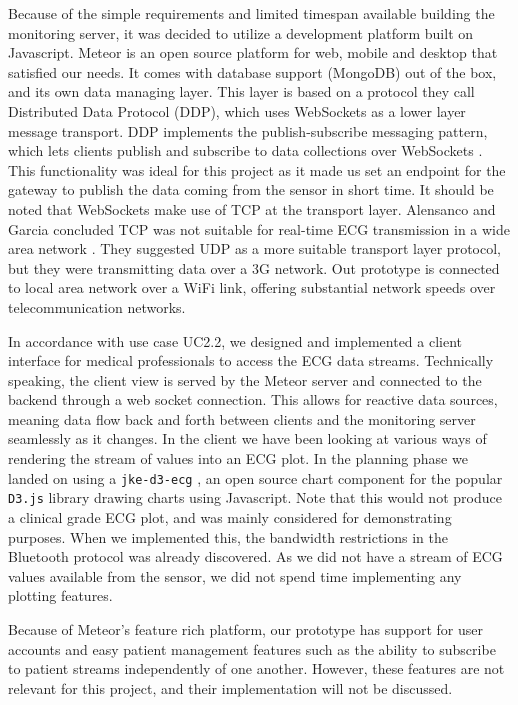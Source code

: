 Because of the simple requirements and limited timespan available building the monitoring server, it was decided to utilize a development platform built on Javascript. Meteor \cite{meteor} is an open source platform for web, mobile and desktop that satisfied our needs. It comes with database support (MongoDB) out of the box, and its own data managing layer. This layer is based on a protocol they call Distributed Data Protocol (DDP), which uses WebSockets as a lower layer message transport. DDP implements the publish-subscribe messaging pattern, which lets clients publish and subscribe to data collections over WebSockets \cite{ddp:github}. This functionality was ideal for this project as it made us set an endpoint for the gateway to publish the data coming from the sensor in short time. It should be noted that WebSockets make use of TCP at the transport layer. Alensanco and Garcia concluded TCP was not suitable for real-time ECG transmission in a wide area network \cite{Alesanco:2010kc}. They suggested UDP as a more suitable transport layer protocol, but they were transmitting data over a 3G network. Out prototype is connected to local area network over a WiFi link, offering substantial network speeds over telecommunication networks.

In accordance with use case \textsc{UC2.2}, we designed and implemented a client interface for medical professionals to access the ECG data streams. Technically speaking, the client view is served by the Meteor server and connected to the backend through a web socket connection. This allows for reactive data sources, meaning data flow back and forth between clients and the monitoring server seamlessly as it changes. In the client we have been looking at various ways of rendering the stream of values into an ECG plot. In the planning phase we landed on using a \texttt{jke-d3-ecg} \cite{jke:d3}, an open source chart component for the popular \texttt{D3.js} library drawing charts using Javascript. Note that this would not produce a clinical grade ECG plot, and was mainly considered for demonstrating purposes. When we implemented this, the bandwidth restrictions in the Bluetooth protocol was already discovered. As we did not have a stream of ECG values available from the sensor, we did not spend time implementing any plotting features. 

Because of Meteor's feature rich platform, our prototype has support for user accounts and easy patient management features such as the ability to subscribe to patient streams independently of one another. However, these features are not relevant for this project, and their implementation will not be discussed.

